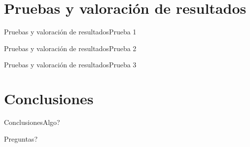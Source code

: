 \documentclass[aspectratio=169,14pt,spanish]{beamer}
\begin{document}
    \section{Pruebas y valoración de resultados}

      \begin{frame}{Pruebas y valoración de resultados}{Prueba 1}


      \end{frame}

      \begin{frame}{Pruebas y valoración de resultados}{Prueba 2}


      \end{frame}

      \begin{frame}{Pruebas y valoración de resultados}{Prueba 3}


      \end{frame}

    \section{Conclusiones}

    \begin{frame}{Conclusiones}{Algo?}


    \end{frame}

    \begin{frame}

      Preguntas?
    \end{frame}
\end{document}
